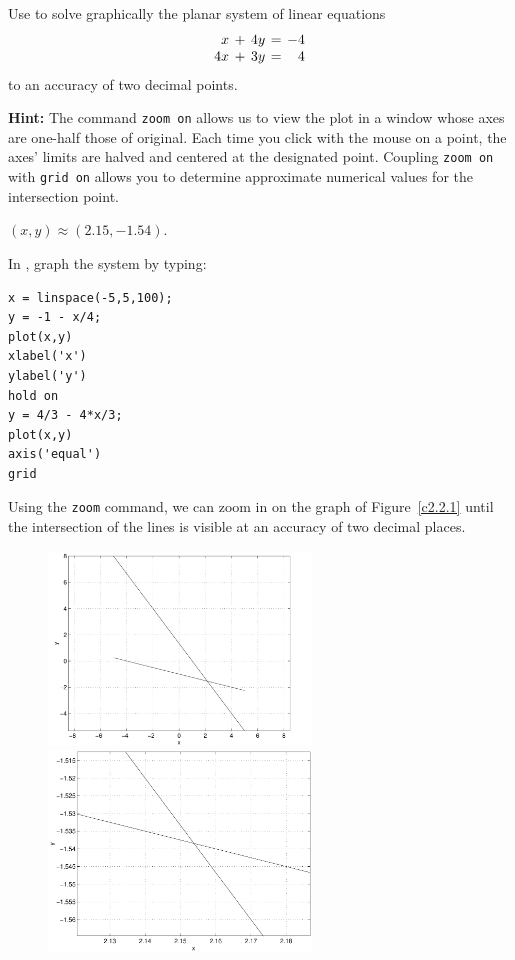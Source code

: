 \documentclass{ximera}
\begin{document}
\begin{computerExercise} \label{c2.2.1}
Use \Matlab to solve graphically the planar system of linear
equations
\[
\arraycolsep 2pt
\begin{array}{rcrcr}
 x & + & 4y & = & -4 \\
4x & + & 3y & = &  4
\end{array}
\]
to an accuracy of two decimal points.

{\bf Hint:} The \Matlab command {\tt zoom on}
allows us to
view the plot in a window whose axes are one-half those of
original.  Each time you click with the mouse on a point,
the axes' limits are halved and centered at the designated
point. Coupling {\tt zoom on} with {\tt grid on} allows you
to determine approximate numerical values for the intersection
point.

\begin{solution}

\ans $(x,y) \approx (2.15,-1.54)$.

\soln In \Matlab, graph the system by typing:
\begin{verbatim}
x = linspace(-5,5,100);
y = -1 - x/4;
plot(x,y)
xlabel('x')
ylabel('y')
hold on
y = 4/3 - 4*x/3;
plot(x,y)
axis('equal')
grid
\end{verbatim}

Using the {\tt zoom} command, we can zoom in on the graph of
Figure~\ref{c2.2.1} until the intersection of the lines is
visible at an accuracy of two decimal places.  

\begin{figure}[htb]
                       \centerline{%
                       \includegraphics[width=2.75in]{exfigure/2-2-1a.pdf}
                       \includegraphics[width=2.75in]{exfigure/2-2-1b.pdf}}
\end{figure}

\end{solution}
\end{computerExercise}
\end{document}
